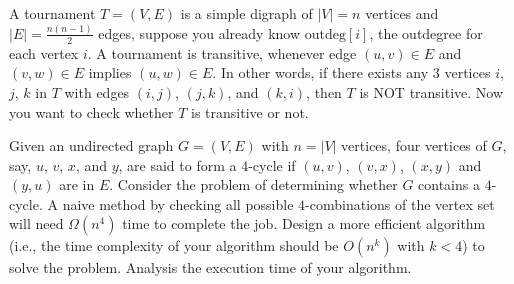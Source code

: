 \begin{refsection}
\begin{Exercise}
A tournament $T = (V, E)$ is a simple digraph of $|V| = n$ vertices and $|E| = \frac{n(n-1)}{2}$ edges, suppose you already know $\text{outdeg}[i]$, the outdegree for each vertex $i$. A tournament is transitive, whenever edge $(u, v) \in E$ and $(v, w) \in E$ implies $(u, w) \in E$. In other words, if there exists any $3$ vertices $i$, $j$, $k$ in $T$ with edges $(i, j)$, $(j, k)$, and $(k, i)$, then $T$ is NOT transitive. Now you want to check whether $T$ is transitive or not. 
\end{Exercise}
\begin{Answer}
\end{Answer}


\begin{Exercise}
Given an undirected graph $G = (V, E)$ with $n = |V|$ vertices, four vertices of $G$, say, $u$, $v$, $x$, and $y$, are said to form a $4$-cycle if $(u, v)$, $(v, x)$, $(x, y)$ and $(y, u)$ are in $E$. Consider the problem of determining whether $G$ contains a $4$-cycle. A naive method by checking all possible $4$-combinations of the vertex set will need $\Omega(n^4)$ time to complete the job. Design a more efficient algorithm (i.e., the time complexity of your algorithm should be $O(n^k)$ with $k < 4$) to solve the problem. Analysis the execution time of your algorithm. 
\end{Exercise}
\begin{Answer}
\end{Answer}


\printbibliography[heading=subbibliography]
\end{refsection}
